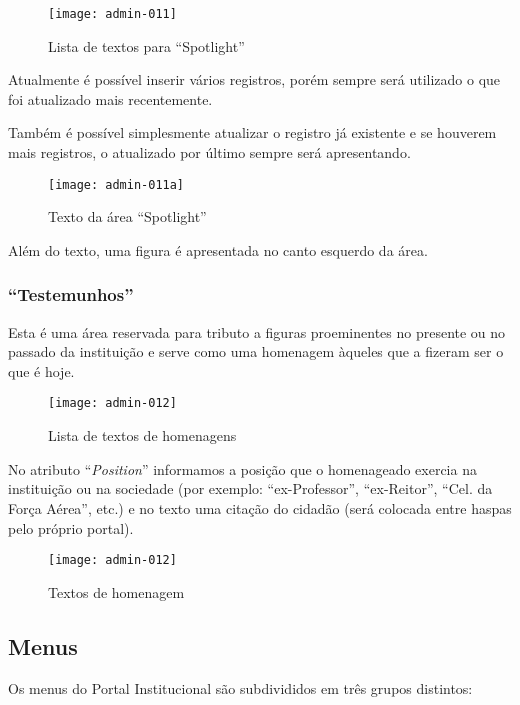 \begin{figure}[!ht]
    \centering
    \texttt{[image: admin-011]}
    \caption{Lista de textos para ``Spotlight''}\label{RS0006:fig:admin-011}
\end{figure}

Atualmente é possível inserir vários registros, porém sempre será utilizado o que foi atualizado mais recentemente.

Também é possível simplesmente atualizar o registro já existente e se houverem mais registros, o atualizado por último sempre será apresentando.

\begin{figure}[!ht]
    \centering
    \texttt{[image: admin-011a]}
    \caption{Texto da área ``Spotlight''}\label{RS0006:fig:admin-011a}
\end{figure}

Além do texto, uma figura é apresentada no canto esquerdo da área.

\subsubsection{``Testemunhos''}

Esta é uma área reservada para tributo a figuras proeminentes no presente ou no passado da instituição e serve como uma homenagem àqueles que a fizeram ser o que é hoje.

\begin{figure}[!ht]
    \centering
    \texttt{[image: admin-012]}
    \caption{Lista de textos de homenagens}\label{RS0006:fig:admin-012}
\end{figure}

No atributo ``\textit{Position}'' informamos a posição que o homenageado exercia na instituição ou na sociedade (por exemplo: ``ex-Professor'', ``ex-Reitor'', ``Cel. da Força Aérea'', etc.) e no texto uma citação do cidadão (será colocada entre haspas pelo próprio portal).

\begin{figure}[!ht]
    \centering
    \texttt{[image: admin-012]}
    \caption{Textos de homenagem}\label{RS0006:fig:admin-012b}
\end{figure}

\subsection{Menus}

Os menus do Portal Institucional são subdivididos em três grupos distintos:

